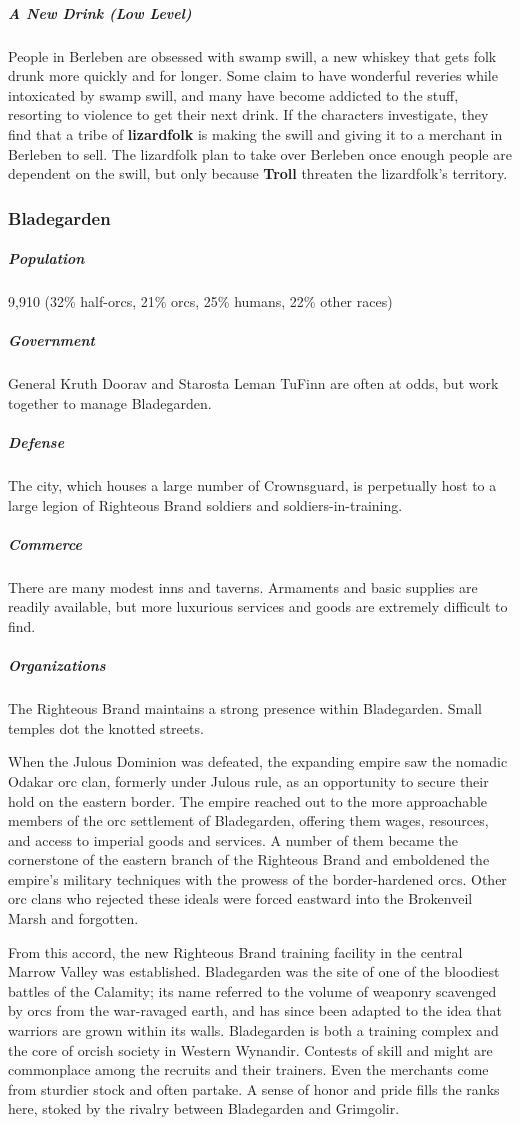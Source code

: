 \documentclass[10pt,a4paper,twoside,bg=print,twocolumn,openany,nodeprecatedcode]{dndbook}
\begin{document}
\subparagraph{A New Drink (Low Level)}
People in Berleben are obsessed with swamp swill, a new whiskey that gets folk drunk more quickly and for longer. Some claim to have wonderful reveries while intoxicated by swamp swill, and many have become addicted to the stuff, resorting to violence to get their next drink. If the characters investigate, they find that a tribe of \textbf{lizardfolk} is making the swill and giving it to a merchant in Berleben to sell. The lizardfolk plan to take over Berleben once enough people are dependent on the swill, but only because \textbf{Troll} threaten the lizardfolk's territory.

\subsubsection{Bladegarden}
\subparagraph{Population}
9,910 (32\% half-orcs, 21\% orcs, 25\% humans, 22\% other races)

\subparagraph{Government}
General Kruth Doorav and Starosta Leman TuFinn are often at odds, but work together to manage Bladegarden.

\subparagraph{Defense}
The city, which houses a large number of Crownsguard, is perpetually host to a large legion of Righteous Brand soldiers and soldiers-in-training.

\subparagraph{Commerce}
There are many modest inns and taverns. Armaments and basic supplies are readily available, but more luxurious services and goods are extremely difficult to find.

\subparagraph{Organizations}
The Righteous Brand maintains a strong presence within Bladegarden. Small temples dot the knotted streets.

When the Julous Dominion was defeated, the expanding empire saw the nomadic Odakar orc clan, formerly under Julous rule, as an opportunity to secure their hold on the eastern border. The empire reached out to the more approachable members of the orc settlement of Bladegarden, offering them wages, resources, and access to imperial goods and services. A number of them became the cornerstone of the eastern branch of the Righteous Brand and emboldened the empire's military techniques with the prowess of the border-hardened orcs. Other orc clans who rejected these ideals were forced eastward into the Brokenveil Marsh and forgotten.

From this accord, the new Righteous Brand training facility in the central Marrow Valley was established. Bladegarden was the site of one of the bloodiest battles of the Calamity; its name referred to the volume of weaponry scavenged by orcs from the war-ravaged earth, and has since been adapted to the idea that warriors are grown within its walls. Bladegarden is both a training complex and the core of orcish society in Western Wynandir. Contests of skill and might are commonplace among the recruits and their trainers. Even the merchants come from sturdier stock and often partake. A sense of honor and pride fills the ranks here, stoked by the rivalry between Bladegarden and Grimgolir.
\end{document}
